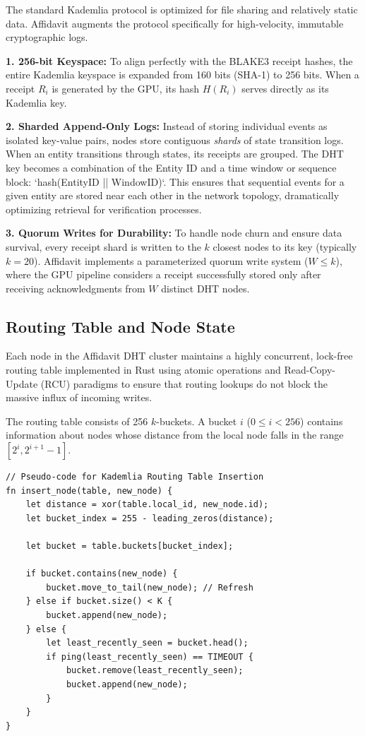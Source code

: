 The standard Kademlia protocol is optimized for file sharing and relatively static data. Affidavit augments the protocol specifically for high-velocity, immutable cryptographic logs.

\textbf{1. 256-bit Keyspace:} To align perfectly with the BLAKE3 receipt hashes, the entire Kademlia keyspace is expanded from 160 bits (SHA-1) to 256 bits. When a receipt $R_i$ is generated by the GPU, its hash $H(R_i)$ serves directly as its Kademlia key.

\textbf{2. Sharded Append-Only Logs:} Instead of storing individual events as isolated key-value pairs, nodes store contiguous \textit{shards} of state transition logs. When an entity transitions through states, its receipts are grouped. The DHT key becomes a combination of the Entity ID and a time window or sequence block: `hash(EntityID || WindowID)`. This ensures that sequential events for a given entity are stored near each other in the network topology, dramatically optimizing retrieval for verification processes.

\textbf{3. Quorum Writes for Durability:} To handle node churn and ensure data survival, every receipt shard is written to the $k$ closest nodes to its key (typically $k=20$). Affidavit implements a parameterized quorum write system ($W \le k$), where the GPU pipeline considers a receipt successfully stored only after receiving acknowledgments from $W$ distinct DHT nodes.

\subsection{Routing Table and Node State}

Each node in the Affidavit DHT cluster maintains a highly concurrent, lock-free routing table implemented in Rust using atomic operations and Read-Copy-Update (RCU) paradigms to ensure that routing lookups do not block the massive influx of incoming writes.

The routing table consists of 256 $k$-buckets. A bucket $i$ ($0 \le i < 256$) contains information about nodes whose distance from the local node falls in the range $[2^i, 2^{i+1} - 1]$. 

\begin{verbatim}
// Pseudo-code for Kademlia Routing Table Insertion
fn insert_node(table, new_node) {
    let distance = xor(table.local_id, new_node.id);
    let bucket_index = 255 - leading_zeros(distance);
    
    let bucket = table.buckets[bucket_index];
    
    if bucket.contains(new_node) {
        bucket.move_to_tail(new_node); // Refresh
    } else if bucket.size() < K {
        bucket.append(new_node);
    } else {
        let least_recently_seen = bucket.head();
        if ping(least_recently_seen) == TIMEOUT {
            bucket.remove(least_recently_seen);
            bucket.append(new_node);
        }
    }
}
\end{verbatim}

